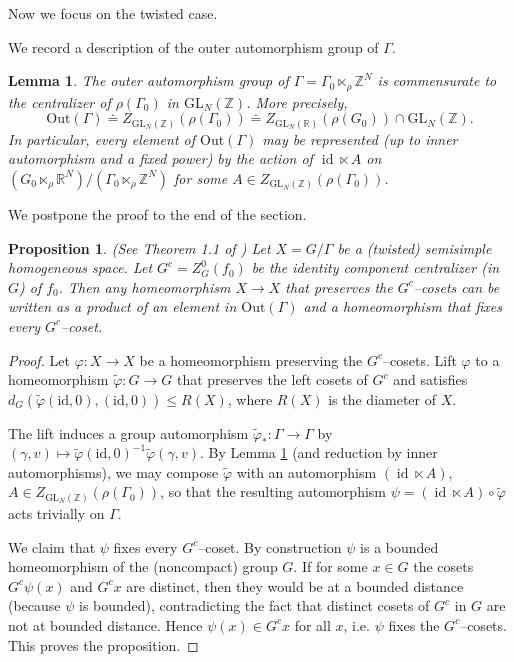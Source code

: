 \documentclass[11pt]{amsart}
\numberwithin{equation}{section}
\newcommand{\R}{\mathbb{R}}
\newcommand{\Z}{\mathbb{Z}}
\theoremstyle{plain}
\newtheorem{prop}[thm]{Proposition}
\newtheorem{lem}[thm]{Lemma}
\begin{document}
Now we focus on the twisted case.

We record a description of the outer automorphism group of $\Gamma$.

\begin{lem}\label{lem:finout}
The outer automorphism group of $\Gamma=\Gamma_0\ltimes_\rho\Z^N$ is
commensurate to the centralizer of $\rho(\Gamma_0)$ in $\mathrm{GL}_N(\Z)$.  More precisely,
\[
\mathrm{Out}(\Gamma)\doteq Z_{\mathrm{GL}_N(\Z)}(\rho(\Gamma_0))
\doteq Z_{\mathrm{GL}_N(\R)}(\rho(G_0))\cap\mathrm{GL}_N(\Z).
\]
In particular, every element of $\mathrm{Out}(\Gamma)$ may be
represented (up to inner automorphism and a fixed power) by the action of
$\operatorname{id}\ltimes A$ on
$(G_0\ltimes_\rho\R^N)/(\Gamma_0\ltimes_\rho\Z^N)$ for some
$A\in Z_{\mathrm{GL}_N(\Z)}(\rho(\Gamma_0))$.
\end{lem}

We postpone the proof to the end of the section.

\begin{prop}\label{prop:coset-fix} (See Theorem 1.1 of \cite{Witte})
Let $X=G
/\Gamma$ be a (twisted) semisimple homogeneous space. Let $G^c=Z_G^0(f_0)$ be the identity component centralizer (in $G$) of $f_0$.  Then
any homeomorphism $X\to X$ that preserves the $G^c$--cosets can be
written as a product of an element in $\mathrm{Out}(\Gamma)$ and a homeomorphism
that fixes every $G^c$--coset.
\end{prop}

\begin{proof}
Let $\varphi:X\to X$ be a homeomorphism preserving the $G^c$--cosets.
Lift $\varphi$ to a homeomorphism $\tilde\varphi:G\to G$ that
preserves the left cosets of $G^c$ and satisfies
$d_{G}(\tilde\varphi(\mathrm{id},0),(\mathrm{id},0))\le R(X)$, where
$R(X)$ is the diameter of $X$.

The lift induces a group automorphism
$\tilde\varphi_*:\Gamma\to\Gamma$ by
$(\gamma,v)\mapsto \tilde\varphi(\mathrm{id},0)^{-1}\tilde\varphi(\gamma,v)$.
By Lemma \ref{lem:finout} (and reduction by inner
automorphisms), we may compose $\tilde\varphi$ with an automorphism
$(\operatorname{id}\ltimes A)$, $A\in
Z_{\mathrm{GL}_N(\Z)}(\rho(\Gamma_0))$, so that the resulting automorphism
$\psi=(\operatorname{id}\ltimes A)\circ\tilde\varphi$ acts trivially on
$\Gamma$.

We claim that $\psi$ fixes every $G^c$--coset.  By construction $\psi$
is a bounded homeomorphism of the (noncompact) group $G$. If for
some $x\in G$ the cosets $G^c\psi(x)$ and $G^c x$ are distinct, then
they would be at a bounded distance (because $\psi$ is bounded), contradicting
the fact that distinct cosets of $G^c$ in $G$ are not at bounded
distance. Hence $\psi(x)\in G^c x$ for all $x$, i.e. $\psi$ fixes the
$G^c$--cosets. This proves the proposition.
\end{proof}
\end{document}
